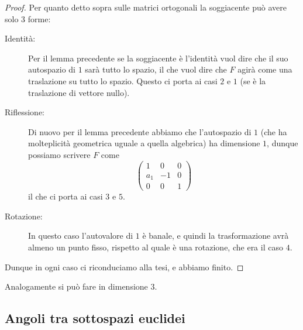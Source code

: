 \documentclass[11pt]{scrartcl}
\begin{document}
   	 \begin{proof}
   	 	Per quanto detto sopra sulle matrici ortogonali la soggiacente può avere solo $3$ forme:
   	 	\begin{description}
   	 		\item[Identità:] Per il lemma precedente se la soggiacente è l'identità vuol dire che il suo autospazio di $1$ sarà tutto lo spazio, il che vuol dire che $F$ agirà come una traslazione su tutto lo spazio. Questo ci porta ai casi $2$ e $1$ (se è la traslazione di vettore nullo).
   	 		\item[Riflessione:] Di nuovo per il lemma precedente abbiamo che l'autospazio di $1$ (che ha molteplicità geometrica uguale a quella algebrica) ha dimensione $1$, dunque possiamo scrivere $F$ come
   	 		$$
   	 		\left(
   	 		\begin{array}{c|cc}
   	 			1 & 0 & 0 \\
   	 			\hline
   	 			a_1 & -1 & 0 \\
   	 			0 & 0 & 1
   	 		\end{array}
   	 		\right)
   	 		$$ 
   	 		il che ci porta ai casi $3$ e $5$.
   	 		\item[Rotazione:] In questo caso l'autovalore di $1$ è banale, e quindi la trasformazione avrà almeno un punto fisso, rispetto al quale è una rotazione, che era il caso $4$.
   	 	\end{description} 
   	 	Dunque in ogni caso ci riconduciamo alla tesi, e abbiamo finito.
   	 \end{proof}
   	 Analogamente si può fare in dimensione $3$.
   	 \subsection{Angoli tra sottospazi euclidei}
   	 
\end{document}
